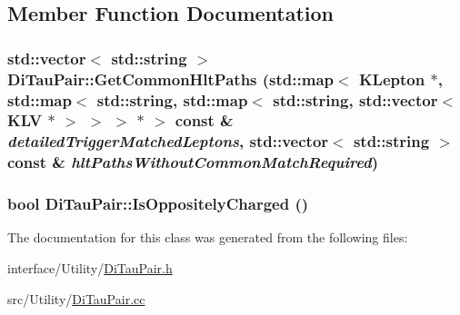 \subsection{Member Function Documentation}
\hypertarget{classDiTauPair_a327dd76a811005aefd533efbf3d49010}{
\subsubsection[{GetCommonHltPaths}]{\setlength{\rightskip}{0pt plus 5cm}std::vector$<$ std::string $>$ DiTauPair::GetCommonHltPaths (std::map$<$ KLepton $\ast$, std::map$<$ std::string, std::map$<$ std::string, std::vector$<$ KLV $\ast$ $>$ $>$ $>$ $\ast$ $>$ const \& {\em detailedTriggerMatchedLeptons}, \/  std::vector$<$ std::string $>$ const \& {\em hltPathsWithoutCommonMatchRequired})}}
\label{classDiTauPair_a327dd76a811005aefd533efbf3d49010}
\hypertarget{classDiTauPair_ae35cca423608713d97775bd0c0c7db95}{
\subsubsection[{IsOppositelyCharged}]{\setlength{\rightskip}{0pt plus 5cm}bool DiTauPair::IsOppositelyCharged ()}}
\label{classDiTauPair_ae35cca423608713d97775bd0c0c7db95}


The documentation for this class was generated from the following files:\begin{DoxyCompactItemize}
\item 
interface/Utility/\hyperlink{DiTauPair_8h}{DiTauPair.h}\item 
src/Utility/\hyperlink{DiTauPair_8cc}{DiTauPair.cc}\end{DoxyCompactItemize}
